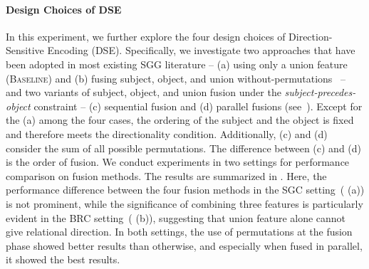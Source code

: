         \paragraph{Design Choices of DSE}
            In this experiment, we further explore the four design choices of Direction-Sensitive Encoding (DSE). Specifically, we investigate two approaches that have been adopted in most existing SGG literature -- (a) using only a union feature~\cite{xu2017scene, lu2016visual, dai2017detecting, yang2018graph, qi2019attentive, chen2019knowledge, chen2019counterfactual, li2017scene, li2018factorizable} (\textsc{Baseline}) and (b) fusing subject, object, and union without-permutations~\cite{zhang2017visual, yang2018shuffle, zellers2018neural, zhang2019graphical, tang2019learning, tang2020unbiased} -- and two variants of subject, object, and union fusion under the \textit{subject-precedes-object} constraint -- (c) sequential fusion and (d) parallel fusions (see~).
            Except for the (a) among the four cases, the ordering of the subject and the object is fixed and therefore meets the directionality condition. Additionally, (c) and (d) consider the sum of all possible permutations. The difference between (c) and (d) is the order of fusion.
            We conduct experiments in two settings for performance comparison on fusion methods. The results are summarized in .
            Here, the performance difference between the four fusion methods in the SGC setting~( (a)) is not prominent, while the significance of combining three features is particularly evident in the BRC setting~( (b)), suggesting that union feature alone cannot give relational direction.
            In both settings, the use of permutations at the fusion phase showed better results than otherwise, and especially when fused in parallel, it showed the best results.

